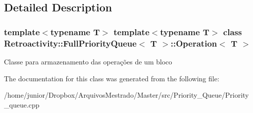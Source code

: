 \subsection{Detailed Description}
\subsubsection*{template$<$typename T$>$\newline
template$<$typename T$>$\newline
class Retroactivity\+::\+Full\+Priority\+Queue$<$ T $>$\+::\+Operation$<$ T $>$}

Classe para armazenamento das operações de um bloco 

The documentation for this class was generated from the following file\+:\begin{DoxyCompactItemize}
\item 
/home/junior/\+Dropbox/\+Arquivos\+Mestrado/\+Master/src/\+Priority\+\_\+\+Queue/Priority\+\_\+queue.\+cpp\end{DoxyCompactItemize}
